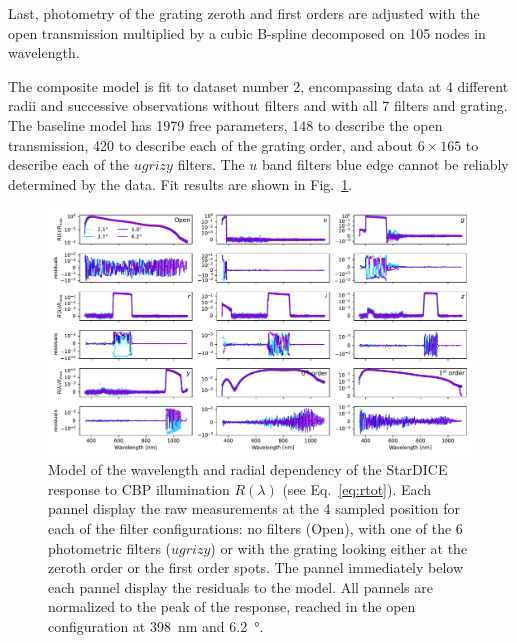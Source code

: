 Last, photometry of the grating zeroth and first orders are adjusted
with the open transmission multiplied by a cubic B-spline decomposed
on 105 nodes in wavelength.

The composite model is fit to dataset number 2, encompassing data at 4
different radii and successive observations without filters and with
all 7 filters and grating. The baseline model has \num{1979} free
parameters, \num{148} to describe the open transmission, \num{420} to
describe each of the grating order, and about $6\times165$ to describe
each of the $ugrizy$ filters. The $u$ band filters blue edge cannot be
reliably determined by the data. Fit results are shown in
Fig.~\ref{fig:lambdathetafitresults}.

\begin{figure}
  \centering
  \includegraphics[width=1\linewidth]{./fig/lambdathetafitresults.pdf}
  \caption{Model of the wavelength and radial dependency of the
    StarDICE response to CBP illumination $R(\lambda)$ (see
    Eq.~\ref{eq:rtot}). Each pannel display the raw measurements at
    the 4 sampled position for each of the filter configurations: no
    filters (Open), with one of the 6 photometric filters ($ugrizy$)
    or with the grating looking either at the zeroth order or the
    first order spots. The pannel immediately below each pannel
    display the residuals to the model. All pannels are normalized to
    the peak of the response, reached in the open configuration at
    \SI{398}{nm} and \SI{6.2}{\degree}.  }
  \label{fig:lambdathetafitresults}
\end{figure}

